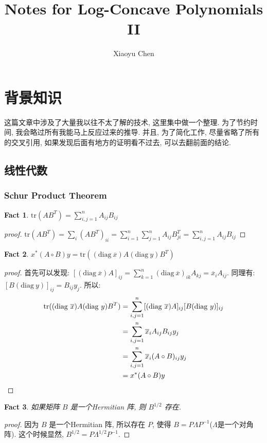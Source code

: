 \documentclass{article}
\title{Notes for Log-Concave Polynomials II}
\author{Xiaoyu Chen}
\date{}
\newtheorem{fact}{Fact}
\def\tr{\mathrm{tr}}
\def\diag{\mathrm{diag}}
\begin{document}
\maketitle
\section{背景知识}
这篇文章中涉及了大量我以往不太了解的技术, 这里集中做一个整理. 为了节约时间, 我会略过所有我能马上反应过来的推导. 并且, 为了简化工作, 尽量省略了所有的交叉引用, 如果发现后面有地方的证明看不过去, 可以去翻前面的结论.
\subsection{线性代数}
\subsubsection{Schur Product Theorem}
\begin{fact}
  $\mathrm{tr}(AB^T) = \sum_{i, j=1}^n A_{ij}B_{ij}$
\end{fact}
\begin{proof}[proof]
  $\mathrm{tr}(AB^T) = \sum_{i} (AB^T)_{ii} 
  = \sum_{i=1}^n\sum_{j=1}^nA_{ij}B^T_{ji} 
  = \sum_{i,j=1}^nA_{ij}B_{ij}  $
\end{proof}

\begin{fact}
  \label{claim_xAoBx}
  $x^*(A\circ B)y = \tr((\diag\ \overline{x}) A (\diag\ y) B^T)$
\end{fact}
\begin{proof}[proof]
  首先可以发现:
  $[(\diag\ \overline{x})A]_{ij} = \sum_{k=1}^n(\diag\ \overline{x})_{ik}A_{kj} = \overline{x}_i A_{ij}$.
  同理有: $[B(\diag\ y)]_{ij} = B_{ij}y_j$.
  所以:
  \begin{align*}
    \tr((\diag\ \overline{x}) A (\diag\ y) B^T) &= \sum_{i, j=1}^n [(\diag\ \overline{x})A]_{ij}[B(\diag\ y)]_{ij} \\
                                                &= \sum_{i, j=1}^n \overline{x}_iA_{ij}B_{ij}y_j \\
                                                &= \sum_{i, j=1}^n \overline{x}_i(A\circ B)_{ij}y_j \\
                                                &= x^*(A\circ B)y \qedhere
  \end{align*}
\end{proof}

\begin{fact}
  如果矩阵 $B$ 是一个Hermitian 阵, 则 $B^{1/2}$ 存在.
\end{fact}
\begin{proof}[proof]
  因为 $B$ 是一个Hermitian 阵, 所以存在 $P$, 使得 $B = P\Lambda P^{-1}$($\Lambda$是一个对角阵).
  这个时候显然, $B^{1/2} = P\Lambda^{1/2} P^{-1}$.
\end{proof}
\end{document}

